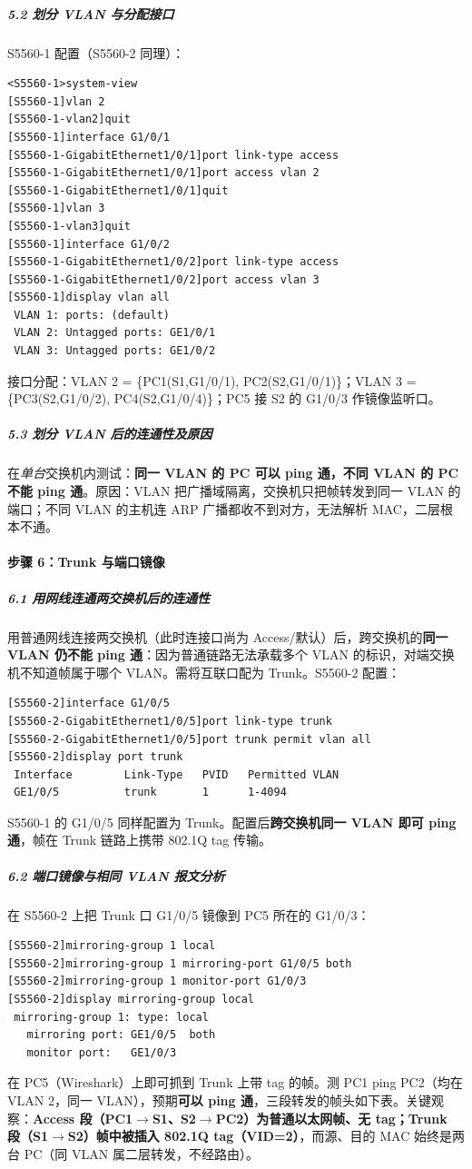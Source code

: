 \documentclass[12pt,a4paper]{article}
\begin{document}
\subparagraph{5.2 划分 VLAN 与分配接口}
S5560-1 配置（S5560-2 同理）：
\begin{lstlisting}[style=cli]
<S5560-1>system-view
[S5560-1]vlan 2
[S5560-1-vlan2]quit
[S5560-1]interface G1/0/1
[S5560-1-GigabitEthernet1/0/1]port link-type access
[S5560-1-GigabitEthernet1/0/1]port access vlan 2
[S5560-1-GigabitEthernet1/0/1]quit
[S5560-1]vlan 3
[S5560-1-vlan3]quit
[S5560-1]interface G1/0/2
[S5560-1-GigabitEthernet1/0/2]port link-type access
[S5560-1-GigabitEthernet1/0/2]port access vlan 3
[S5560-1]display vlan all
 VLAN 1: ports: (default)
 VLAN 2: Untagged ports: GE1/0/1
 VLAN 3: Untagged ports: GE1/0/2
\end{lstlisting}
接口分配：VLAN 2 = \{PC1(S1,G1/0/1), PC2(S2,G1/0/1)\}；VLAN 3 = \{PC3(S2,G1/0/2), PC4(S2,G1/0/4)\}；PC5 接 S2 的 G1/0/3 作镜像监听口。

\subparagraph{5.3 划分 VLAN 后的连通性及原因}
在\emph{单台}交换机内测试：\textbf{同一 VLAN 的 PC 可以 ping 通，不同 VLAN 的 PC 不能 ping 通}。原因：VLAN 把广播域隔离，交换机只把帧转发到同一 VLAN 的端口；不同 VLAN 的主机连 ARP 广播都收不到对方，无法解析 MAC，二层根本不通。

\paragraph{步骤 6：Trunk 与端口镜像}

\subparagraph{6.1 用网线连通两交换机后的连通性}
用普通网线连接两交换机（此时连接口尚为 Access/默认）后，跨交换机的\textbf{同一 VLAN 仍不能 ping 通}：因为普通链路无法承载多个 VLAN 的标识，对端交换机不知道帧属于哪个 VLAN。需将互联口配为 Trunk。S5560-2 配置：
\begin{lstlisting}[style=cli]
[S5560-2]interface G1/0/5
[S5560-2-GigabitEthernet1/0/5]port link-type trunk
[S5560-2-GigabitEthernet1/0/5]port trunk permit vlan all
[S5560-2]display port trunk
 Interface        Link-Type   PVID   Permitted VLAN
 GE1/0/5          trunk       1      1-4094
\end{lstlisting}
S5560-1 的 G1/0/5 同样配置为 Trunk。配置后\textbf{跨交换机同一 VLAN 即可 ping 通}，帧在 Trunk 链路上携带 802.1Q tag 传输。

\subparagraph{6.2 端口镜像与相同 VLAN 报文分析}
在 S5560-2 上把 Trunk 口 G1/0/5 镜像到 PC5 所在的 G1/0/3：
\begin{lstlisting}[style=cli]
[S5560-2]mirroring-group 1 local
[S5560-2]mirroring-group 1 mirroring-port G1/0/5 both
[S5560-2]mirroring-group 1 monitor-port G1/0/3
[S5560-2]display mirroring-group local
 mirroring-group 1: type: local
   mirroring port: GE1/0/5  both
   monitor port:   GE1/0/3
\end{lstlisting}
在 PC5（Wireshark）上即可抓到 Trunk 上带 tag 的帧。测 PC1 ping PC2（均在 VLAN 2，同一 VLAN），预期\textbf{可以 ping 通}，三段转发的帧头如下表。关键观察：\textbf{Access 段（PC1$\to$S1、S2$\to$PC2）为普通以太网帧、无 tag；Trunk 段（S1$\to$S2）帧中被插入 802.1Q tag（VID=2）}，而源、目的 MAC 始终是两台 PC（同 VLAN 属二层转发，不经路由）。
\end{document}
